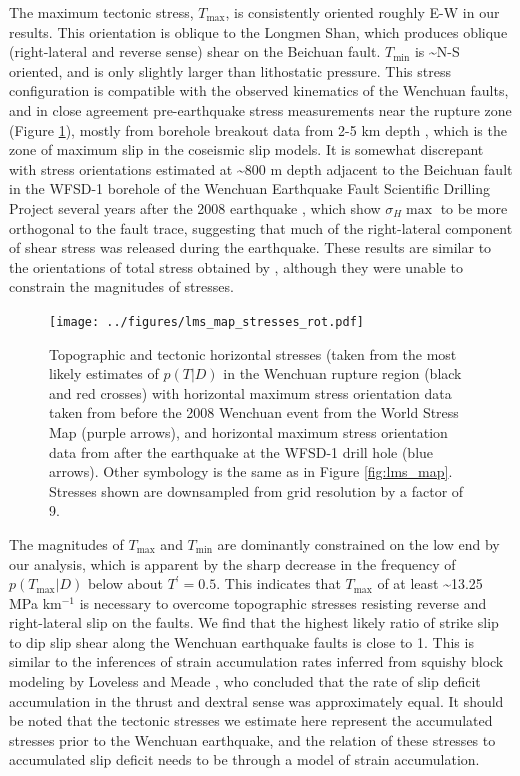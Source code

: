 \documentclass[twocolumn,jgrga]{AGUTeX}
\begin{document}
\begin{article}
The maximum tectonic stress, $T_{\mathrm{max}}$, is consistently
oriented roughly E-W in our results. This orientation is oblique to the
Longmen Shan, which produces oblique (right-lateral and reverse sense)
shear on the Beichuan fault. $T_{\mathrm{min}}$ is \textasciitilde{}N-S
oriented, and is only slightly larger than lithostatic pressure. This
stress configuration is compatible with the observed kinematics of the
Wenchuan faults, and in close agreement pre-earthquake stress
measurements near the rupture zone (Figure \ref{fig:lms_stress_map}),
mostly from borehole breakout data from 2-5 km depth
\citep{heidbach2009}, which is the zone of maximum slip in the coseismic
slip models. It is somewhat discrepant with stress orientations
estimated at \textasciitilde{}800 m depth adjacent to the Beichuan fault
in the WFSD-1 borehole of the Wenchuan Earthquake Fault Scientific
Drilling Project several years after the 2008 earthquake \citep{cui2014},
which show $\sigma_H {\mathrm{\max}}$ to be more orthogonal to the fault
trace, suggesting that much of the right-lateral component of shear
stress was released during the earthquake. These results are similar to
the orientations of total stress obtained by 
\citet{medinaluna2013}, although they were unable to constrain the
magnitudes of stresses.

\begin{figure}[t]
\centering
\texttt{[image: ../figures/lms\_map\_stresses\_rot.pdf]}
\caption{Topographic and tectonic horizontal stresses (taken from the
most likely estimates of $p(T|D)$ in the Wenchuan rupture region (black
and red crosses) with horizontal maximum stress orientation data taken
from before the 2008 Wenchuan event from the World Stress Map
\citep{heidbach2009} (purple arrows), and horizontal maximum stress
orientation data from after the earthquake at the WFSD-1 drill hole
\citep{cui2014} (blue arrows). Other symbology is the same as in Figure
\ref{fig:lms_map}. Stresses shown are downsampled from grid resolution
by a factor of 9.}
\label{fig:lms_stress_map}
\end{figure}

The magnitudes of $T_{\mathrm{max}}$ and $T_{\mathrm{min}}$ are
dominantly constrained on the low end by our analysis, which is apparent
by the sharp decrease in the frequency of $p(T_{\mathrm{max}}|D)$ below
about $T^\prime = 0.5$. This indicates that $T_{\mathrm{max}}$ of at
least \textasciitilde{}13.25 MPa km$^{-1}$ is necessary to overcome
topographic stresses resisting reverse and right-lateral slip on the
faults. We find that the highest likely ratio of strike slip to dip slip
shear along the Wenchuan earthquake faults is close to 1. This is
similar to the inferences of strain accumulation rates inferred from
squishy block modeling by Loveless and Meade \citet{loveless2011}, who
concluded that the rate of slip deficit accumulation in the thrust and
dextral sense was approximately equal. It should be noted that the
tectonic stresses we estimate here represent the accumulated stresses
prior to the Wenchuan earthquake, and the relation of these stresses to
accumulated slip deficit needs to be through a model of strain
accumulation.


\end{article}
\end{document}
